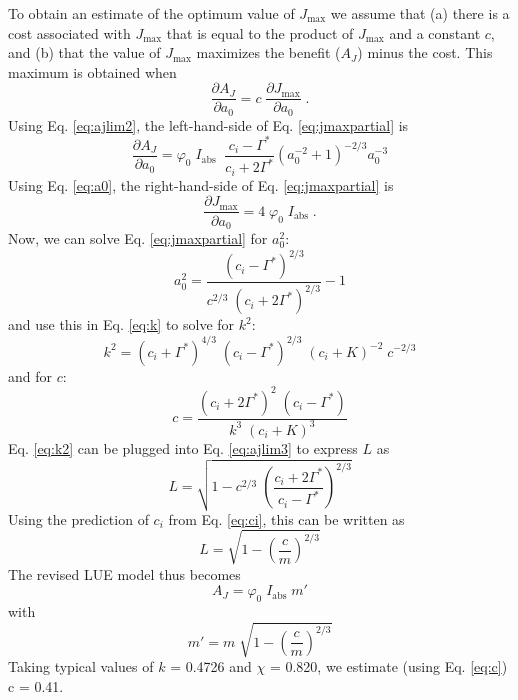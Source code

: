 \documentclass{myreport}
\begin{document}
To obtain an estimate of the optimum value of $J_{\mathrm{max}}$ we assume that (a) there is a cost associated with $J_{\mathrm{max}}$ that is equal to the product of $J_{\mathrm{max}}$ and a constant $c$, and (b) that the value of $J_{\mathrm{max}}$ maximizes the benefit ($A_J$) minus the cost. 
This maximum is obtained when
\begin{equation}
\label{eq:jmaxpartial}
    \frac{\partial A_J}{\partial a_0} = c \; \frac{\partial J_{\mathrm{max}}}{\partial a_0}\;.
\end{equation}
Using Eq. \ref{eq:ajlim2}, the left-hand-side of Eq. \ref{eq:jmaxpartial} is 
\begin{equation}
    \frac{\partial A_J}{\partial a_0} = \varphi_0 \; I_{\mathrm{abs}} \; \; \frac{c_i - \Gamma^{\ast}}{c_i + 2\Gamma^{\ast}} \left( a_0^{-2} + 1 \right) ^{-2/3} a_0^{-3}
\end{equation}
Using Eq. \ref{eq:a0}, the right-hand-side of Eq. \ref{eq:jmaxpartial} is 
\begin{equation}
    \frac{\partial J_{\mathrm{max}}}{\partial a_0} = 4 \; \varphi_0 \; I_{\mathrm{abs}}\;.
\end{equation}
Now, we can solve Eq. \ref{eq:jmaxpartial} for $a_0^2$:
\begin{equation}
\label{eq:a0}
a_0^2 = \frac{(c_i - \Gamma^{\ast})^{2/3}}{c^{2/3} \; (c_i+2\Gamma^{\ast})^{2/3}}-1
\end{equation}
and use this in Eq. \ref{eq:k} to solve for $k^2$:
\begin{equation}
\label{eq:k2}
k^2 = (c_i+ \Gamma^{\ast})^{4/3} \; (c_i - \Gamma^{\ast})^{2/3} \; (c_i + K)^{-2} \; c^{-2/3}
\end{equation}
and for $c$:
\begin{equation}
\label{eq:c}
    c = \frac{(c_i+2\Gamma^{\ast})^2\;(c_i-\Gamma^{\ast})}{k^3\;(c_i+K)^3}
\end{equation}
Eq. \ref{eq:k2} can be plugged into Eq. \ref{eq:ajlim3} to express $L$ as
\begin{equation}
    L = \sqrt{1-c^{2/3} \; \left( \frac{c_i+2\Gamma^{\ast}}{c_i-\Gamma^{\ast}}\right)^{2/3}  }
\end{equation}
Using the prediction of $c_i$ from Eq. \ref{eq:ci}, this can be written as
\begin{equation}
    L =  \sqrt{1 - \left( \frac{c}{m} \right)^{2/3} }
\end{equation}
The revised LUE model thus becomes
\begin{equation}
\label{eq:ajlim4}
    A_J = \varphi_0 \; I_{\mathrm{abs}} \; m'
\end{equation}
with
\begin{equation}
    m' = m \; \sqrt{1 - \left( \frac{c}{m} \right)^{2/3} }
\end{equation}
Taking typical values of $k$ = 0.4726 and $\chi$ = 0.820, we estimate (using Eq. \ref{eq:c}) c = 0.41.
\end{document}
